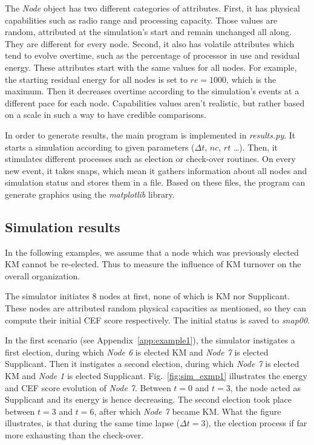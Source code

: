 The \emph{Node} object has two different categories of attributes. First, it has physical capabilities such as radio range and processing capacity. Those values are random, attributed at the simulation's start and remain unchanged all along. They are different for every node. Second, it also has volatile attributes which tend to evolve overtime, such as the percentage of processor in use and residual energy. These attributes start with the same values for all nodes. For example, the starting residual energy for all nodes is set to $re = 1000$, which is the maximum. Then it decreases overtime according to the simulation's events at a different pace for each node. Capabilities values aren't realistic, but rather based on a scale in such a way to have credible comparisons.

In order to generate results, the main program is implemented in \emph{results.py}. It starts a simulation according to given parameters ($\Delta t$, $nc$, $rt$ \ldots). Then, it stimulates different processes such as election or check-over routines. On every new event, it takes snaps, which mean it gathers information about all nodes and simulation status and stores them in a file. Based on these files, the program can generate graphics using the \emph{matplotlib} library.

\subsection{Simulation results}

In the following examples, we assume that a node which was previously elected KM cannot be re-elected. Thus to measure the influence of KM turnover on the overall organization.

The simulator initiates 8 nodes at first, none of which is KM nor Supplicant. These nodes are attributed random physical capacities as mentioned, so they can compute their initial CEF score respectively. The initial status is saved to \emph{snap00}.

In the first scenario (see Appendix~\ref{app:example1}), the simulator instigates a first election, during which \emph{Node 6} is elected KM and \emph{Node 7} is elected Supplicant. Then it instigates a second election, during which \emph{Node 7} is elected KM and \emph{Node 1} is elected Supplicant. Fig.~\ref{fig:sim_exmp1} illustrates the energy and CEF score evolution of \emph{Node 7}. Between $t = 0$ and $t = 3$, the node acted as Supplicant and its energy is hence decreasing. The second election took place between $t = 3$ and $t = 6$, after which \emph{Node 7} became KM. What the figure illustrates, is that during the same time lapse ($\Delta t= 3$), the election process if far more exhausting than the check-over.

